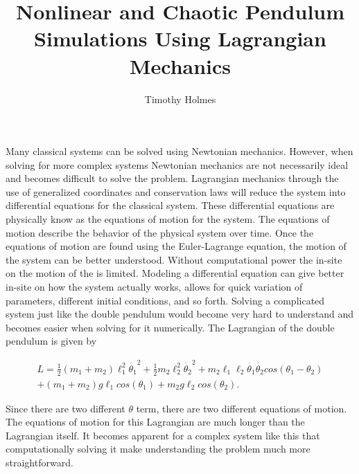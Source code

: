 \documentclass[runningheads]{llncs}
\begin{document}
\title{Nonlinear and Chaotic Pendulum Simulations Using Lagrangian Mechanics}
%
\author{Timothy Holmes}
%
%
%
\maketitle              %
%
Many classical systems can be solved using Newtonian mechanics. However, when solving for more complex systems Newtonian mechanics are not necessarily ideal and becomes difficult to solve the problem. Lagrangian mechanics through the use of generalized coordinates and conservation laws will reduce the system into differential equations for the classical system. These differential equations are physically know as the equations of motion for the system. The equations of motion describe the behavior of the physical system over time. Once the equations of motion are found using the Euler-Lagrange equation, the motion of the system can be better understood. Without computational power the in-site on the motion of the is limited. Modeling a differential equation can give better in-site on how the system actually works, allows for quick variation of parameters, different initial conditions, and so forth. Solving a complicated system just like the double pendulum would become very hard to understand and becomes easier when solving for it numerically. The Lagrangian of the double pendulum is given by

\begin{multline}
    L = \frac{1}{2}(m_{1} + m_{2}) \ell_{1}^{2}\dot{\theta_{1}}^{2} + \frac{1}{2}m_{2}\ell_{2}^{2}\dot{\theta_{2}}^{2} + m_{2}\ell_{1}\ell_{2}  \dot{\theta_{1}}\dot{\theta_{2}}cos(\theta_{1} - \theta_{2})\\ + (m_1 + m_2)g\ell_{1}cos(\theta_{1}) + m_{2}g\ell_{2}cos(\theta_{2}).
\end{multline}

Since there are two different $\theta$ term, there are two different equations of motion. The equations of motion for this Lagrangian are much longer than the Lagrangian itself. It becomes apparent for a complex system like this that computationally solving it make understanding the problem much more straightforward.  
\end{document}

